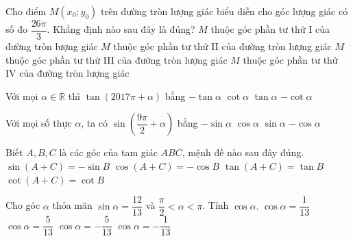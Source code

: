 \begin{ex}%
		Cho điểm $M (x_0;y_0)$ trên đường tròn lượng giác biểu diễn cho góc lượng giác có số đo $\dfrac{26 \pi}{3}$. Khẳng định nào sau đây là đúng?
		\choice
		{$M$ thuộc góc phần tư thứ I của đường tròn lượng giác}
		{\True $M$ thuộc góc phần tư thứ II của đường tròn lượng giác}
		{$M$ thuộc góc phần tư thứ III của đường tròn lượng giác}
		{$M$ thuộc góc phần tư thứ IV của đường tròn lượng giác}
\end{ex}

\begin{ex}%
	Với mọi $\alpha \in \mathbb{R}$ thì $\tan \left({2017\pi+\alpha}\right)$ bằng 
	\choice
	{$-\tan \alpha$}
	{$\cot \alpha$}
	{\True $\tan \alpha$}
	{$-\cot \alpha$}
\end{ex}

\begin{ex}%
	Với mọi số thực $\alpha $, ta có $\sin \left({\dfrac{{9\pi}}{2}+\alpha}\right)$ bằng
	\choice
	{$-\sin \alpha$}
	{\True $\cos \alpha$}
	{$\sin \alpha$}
	{$-\cos \alpha$}
\end{ex}

\begin{ex}%
	Biết $A,B,C$ là các góc của tam giác $ABC$, mệnh đề nào sau đây đúng.
	\choice
	{$\sin \left({A+C}\right)=-\sin B$}
	{\True $\cos \left({A+C}\right)=-\cos B$}
	{$\tan \left({A+C}\right)=\tan B$}
	{$\cot \left({A+C}\right)=\cot B$}
\end{ex}


\begin{ex}%
	Cho góc $\alpha $ thỏa mãn $\sin \alpha =\dfrac{{12}}{{13}}$ và $\dfrac{\pi}{2}<\alpha <\pi $. Tính $\cos \alpha.$
	\choice
	{$\cos \alpha =\dfrac{1}{{13}}$}
	{$\cos \alpha =\dfrac{5}{{13}}$}
	{\True $\cos \alpha =-\dfrac{5}{{13}}$}
	{$\cos \alpha =-\dfrac{1}{{13}}$}
\end{ex}

